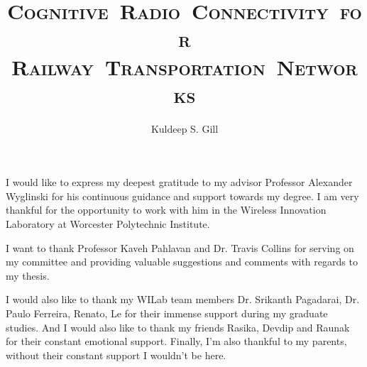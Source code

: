 \documentclass[11pt]{mvlthesis}
\title{\scshape \mbox{Cognitive Radio Connectivity for}\\
\scshape \mbox{Railway Transportation Networks}}
\author{Kuldeep S. Gill}
\begin{document}
\maketitle
\begin{abstract}



\end{abstract}

\begin{frontmatter}
\begin{acknowledgements}
\begin{center}
\vspace{0.4in}
I would like to express my deepest gratitude to my advisor Professor Alexander Wyglinski for his continuous guidance and support towards my degree. I am very thankful for the opportunity to work with him in the Wireless Innovation Laboratory at Worcester Polytechnic Institute. 

I want to thank Professor Kaveh Pahlavan and Dr. Travis Collins for serving on my committee and providing valuable suggestions and comments with regards to my thesis. 

I would also like to thank my WILab team members Dr. Srikanth Pagadarai, Dr. Paulo Ferreira, Renato, Le for their immense support during my graduate studies. And I would also like to thank my friends Rasika, Devdip and Raunak for their constant emotional support. Finally, I'm also thankful to my parents, without their constant support I wouldn't be here.

\end{center}
\end{acknowledgements}

\tableofcontents
\listoffigures
\listoftables

\end{frontmatter}



%















\appendix


\end{document}
